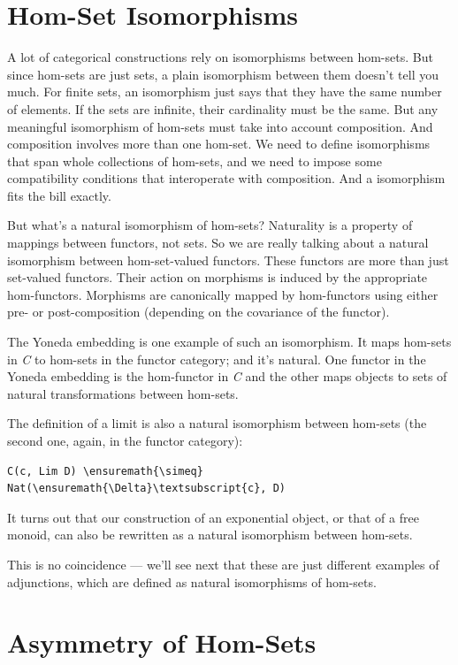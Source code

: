 \section{Hom-Set Isomorphisms}\label{hom-set-isomorphisms}

A lot of categorical constructions rely on isomorphisms between
hom-sets. But since hom-sets are just sets, a plain isomorphism between
them doesn't tell you much. For finite sets, an isomorphism just says
that they have the same number of elements. If the sets are infinite,
their cardinality must be the same. But any meaningful isomorphism of
hom-sets must take into account composition. And composition involves
more than one hom-set. We need to define isomorphisms that span whole
collections of hom-sets, and we need to impose some compatibility
conditions that interoperate with composition. And a 
isomorphism fits the bill exactly.

But what's a natural isomorphism of hom-sets? Naturality is a property
of mappings between functors, not sets. So we are really talking about a
natural isomorphism between hom-set-valued functors. These functors are
more than just set-valued functors. Their action on morphisms is induced
by the appropriate hom-functors. Morphisms are canonically mapped by
hom-functors using either pre- or post-composition (depending on the
covariance of the functor).

The Yoneda embedding is one example of such an isomorphism. It maps
hom-sets in \emph{C} to hom-sets in the functor category; and it's
natural. One functor in the Yoneda embedding is the hom-functor in
\emph{C} and the other maps objects to sets of natural transformations
between hom-sets.

The definition of a limit is also a natural isomorphism between hom-sets
(the second one, again, in the functor category):

\begin{Verbatim}[commandchars=\\\{\}]
C(c, Lim D) \ensuremath{\simeq} Nat(\ensuremath{\Delta}\textsubscript{c}, D)
\end{Verbatim}
It turns out that our construction of an exponential object, or that of
a free monoid, can also be rewritten as a natural isomorphism between
hom-sets.

This is no coincidence --- we'll see next that these are just different
examples of adjunctions, which are defined as natural isomorphisms of
hom-sets.

\section{Asymmetry of Hom-Sets}\label{asymmetry-of-hom-sets}

